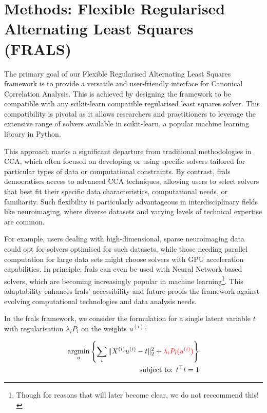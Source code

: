 \section{Methods: Flexible Regularised Alternating Least Squares (FRALS)}\label{subsec:flexible-regularised-alternating-least-squares-(frals)}

The primary goal of our Flexible Regularised Alternating Least Squares framework is to provide a versatile and user-friendly interface for Canonical Correlation Analysis. This is achieved by designing the framework to be compatible with any scikit-learn compatible regularised least squares solver.
This compatibility is pivotal as it allows researchers and practitioners to leverage the extensive range of solvers available in scikit-learn, a popular machine learning library in Python.

This approach marks a significant departure from traditional methodologies in CCA, which often focused on developing or using specific solvers tailored for particular types of data or computational constraints.
By contrast, \acrshort{frals} democratises access to advanced CCA techniques, allowing users to select solvers that best fit their specific data characteristics, computational needs, or familiarity.
Such flexibility is particularly advantageous in interdisciplinary fields like neuroimaging, where diverse datasets and varying levels of technical expertise are common.

For example, users dealing with high-dimensional, sparse neuroimaging data could opt for solvers optimised for such datasets, while those needing parallel computation for large data sets might choose solvers with GPU acceleration capabilities.
In principle, \acrshort{frals} can even be used with Neural Network-based solvers, which are becoming increasingly popular in machine learning\footnote{Though for reasons that will later become clear, we do not reccommend this!}.
This adaptability enhances \acrshort{frals}' accessibility and future-proofs the framework against evolving computational technologies and data analysis needs.

In the \acrshort{frals} framework, we consider the formulation for a single latent variable \(t\) with regularisation \(\lambda_i P_i\) on the weights \(u^{(i)}\):

\begin{align}
    \underset{u}{\mathrm{argmin}}\left\{\sum_i \|X^{(i)} u^{(i)} - t\|_2^2 + \textcolor{red}{\lambda_i P_i(u^{(i)})} \right\}\\
    \text{subject to: }t^\top t = 1 \notag
\end{align}

